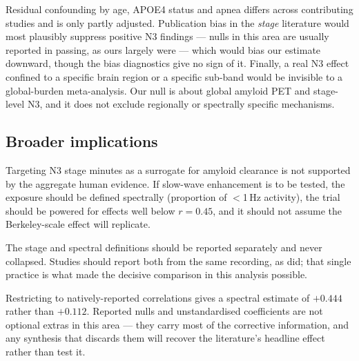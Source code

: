  Residual confounding by age, APOE4 status and apnea differs
across contributing studies and is only partly adjusted. Publication bias in the \emph{stage}
literature would most plausibly suppress positive N3 findings --- nulls in this area are usually
reported in passing, as ours largely were --- which would bias our estimate downward, though the
bias diagnostics give no sign of it. Finally, a real N3 effect confined to a specific brain
region or a specific sub-band would be invisible to a global-burden meta-analysis. Our null is
about global amyloid PET and stage-level N3, and it does not exclude regionally or spectrally
specific mechanisms.

\subsection{Broader implications}

 Targeting N3 stage minutes as a surrogate for amyloid clearance is not
supported by the aggregate human evidence. If slow-wave enhancement is to be tested, the exposure
should be defined spectrally (proportion of $<$1\,Hz activity), the trial should be powered for
effects well below $r = 0.45$, and it should not assume the Berkeley-scale effect will replicate.

 The stage and spectral definitions should be reported separately
and never collapsed. Studies should report both from the same recording, as \citet{winer2020}
did; that single practice is what made the decisive comparison in this analysis possible.

 Restricting to natively-reported correlations gives a spectral
estimate of $+0.444$ rather than $+0.112$. Reported nulls and unstandardised coefficients are not
optional extras in this area --- they carry most of the corrective information, and any synthesis
that discards them will recover the literature's headline effect rather than test it.

